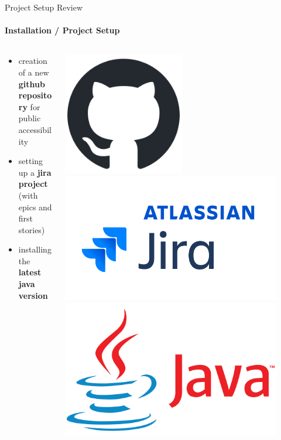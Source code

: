 \documentclass[
    ngerman,%
    authorontitle=true,
]{bfhbeamer}
\begin{document}
    \begin{frame}{Project Setup Review}
        \framesubtitle{Installation / Project Setup}
    	\begin{columns} %
    		\begin{column}{0.7\textwidth} %
    			\begin{itemize}
    				\item creation of a new \textbf{github repository} for public accessibility
    				\item setting up a \textbf{jira project} (with epics and first stories)
    				\item installing the \textbf{latest java version}
    			\end{itemize}
    		\end{column}
    		\begin{column}{0.23\textwidth} %
	    		\begin{center}
	    			\includegraphics[width=0.5\textwidth]{pictures/github-mark.png}
                    \includegraphics[width=0.9\textwidth]{pictures/jira_logo.png}
                    \includegraphics[width=0.9\textwidth]{pictures/Java-Logo.png}

\end{center}
\end{column}
\end{columns}
\end{frame}
\end{document}
